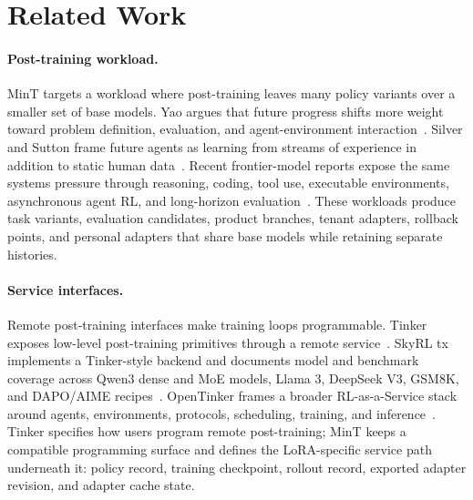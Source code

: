 \section{Related Work}
\label{sec:related}

\paragraph{Post-training workload.}
MinT targets a workload where post-training leaves many policy variants over a smaller set of base models. Yao argues that future progress shifts more weight toward problem definition, evaluation, and agent-environment interaction~\citep{yao_second_half_2025}. Silver and Sutton frame future agents as learning from streams of experience in addition to static human data~\citep{silver_sutton_experience_2025}. Recent frontier-model reports expose the same systems pressure through reasoning, coding, tool use, executable environments, asynchronous agent RL, and long-horizon evaluation~\citep{deepseek_v4_release_2026,deepseekv4_2026,glm5_2026,kimi_k25_2026,minimax_m27_2026,qwen35_2026,openai_gpt55_2026,anthropic_opus45_2025,anthropic_agent_autonomy_2026}. These workloads produce task variants, evaluation candidates, product branches, tenant adapters, rollback points, and personal adapters that share base models while retaining separate histories.

\paragraph{Service interfaces.}
Remote post-training interfaces make training loops programmable. Tinker exposes low-level post-training primitives through a remote service~\citep{tinker2025,tinker_cookbook}. SkyRL tx implements a Tinker-style backend and documents model and benchmark coverage across Qwen3 dense and MoE models, Llama 3, DeepSeek V3, GSM8K, and DAPO/AIME recipes~\citep{skyrl_tx}. OpenTinker frames a broader RL-as-a-Service stack around agents, environments, protocols, scheduling, training, and inference~\citep{opentinker2026}. Tinker specifies how users program remote post-training; MinT keeps a compatible programming surface and defines the LoRA-specific service path underneath it: policy record, training checkpoint, rollout record, exported adapter revision, and adapter cache state.

